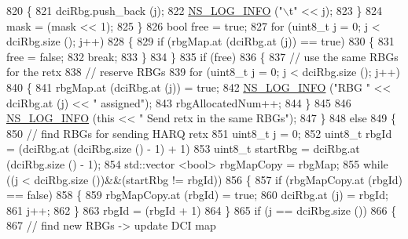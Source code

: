 \begin{DoxyCode}
820                 \{
821                   dciRbg.push\_back (j);
822                   \hyperlink{group__logging_gafbd73ee2cf9f26b319f49086d8e860fb}{NS\_LOG\_INFO} (\textcolor{stringliteral}{"\(\backslash\)t"} << j);
823                 \}
824               mask = (mask << 1);
825             \}
826           \textcolor{keywordtype}{bool} free = \textcolor{keyword}{true};
827           \textcolor{keywordflow}{for} (uint8\_t j = 0; j < dciRbg.size (); j++)
828             \{
829               \textcolor{keywordflow}{if} (rbgMap.at (dciRbg.at (j)) == \textcolor{keyword}{true})
830                 \{
831                   free = \textcolor{keyword}{false};
832                   \textcolor{keywordflow}{break};
833                 \}
834             \}
835           \textcolor{keywordflow}{if} (free)
836             \{
837               \textcolor{comment}{// use the same RBGs for the retx}
838               \textcolor{comment}{// reserve RBGs}
839               \textcolor{keywordflow}{for} (uint8\_t j = 0; j < dciRbg.size (); j++)
840                 \{
841                   rbgMap.at (dciRbg.at (j)) = \textcolor{keyword}{true};
842                   \hyperlink{group__logging_gafbd73ee2cf9f26b319f49086d8e860fb}{NS\_LOG\_INFO} (\textcolor{stringliteral}{"RBG "} << dciRbg.at (j) << \textcolor{stringliteral}{" assigned"});
843                   rbgAllocatedNum++;
844                 \}
845 
846               \hyperlink{group__logging_gafbd73ee2cf9f26b319f49086d8e860fb}{NS\_LOG\_INFO} (\textcolor{keyword}{this} << \textcolor{stringliteral}{" Send retx in the same RBGs"});
847             \}
848           \textcolor{keywordflow}{else}
849             \{
850               \textcolor{comment}{// find RBGs for sending HARQ retx}
851               uint8\_t j = 0;
852               uint8\_t rbgId = (dciRbg.at (dciRbg.size () - 1) + 1) %
853               uint8\_t startRbg = dciRbg.at (dciRbg.size () - 1);
854               std::vector <bool> rbgMapCopy = rbgMap;
855               \textcolor{keywordflow}{while} ((j < dciRbg.size ())&&(startRbg != rbgId))
856                 \{
857                   \textcolor{keywordflow}{if} (rbgMapCopy.at (rbgId) == \textcolor{keyword}{false})
858                     \{
859                       rbgMapCopy.at (rbgId) = \textcolor{keyword}{true};
860                       dciRbg.at (j) = rbgId;
861                       j++;
862                     \}
863                   rbgId = (rbgId + 1) %
864                 \}
865               \textcolor{keywordflow}{if} (j == dciRbg.size ())
866                 \{
867                   \textcolor{comment}{// find new RBGs -> update DCI map}

\end{DoxyCode}
